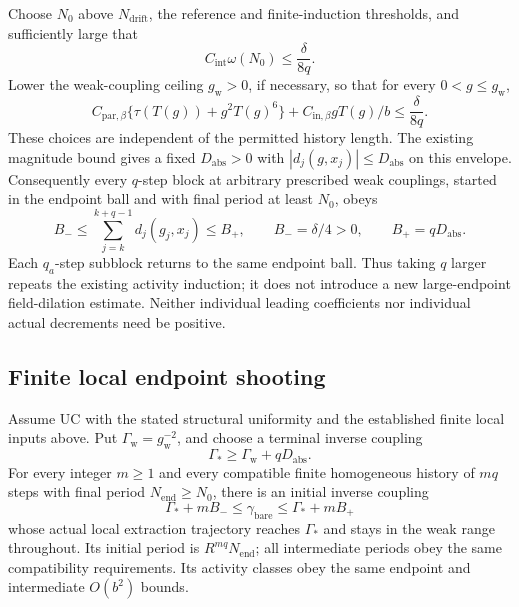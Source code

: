 Choose \(N_0\) above \(N_{\mathrm{drift}}\), the reference and
finite-induction thresholds, and sufficiently large that
\begin{equation}
 C_{\mathrm{int}}\omega(N_0)\le\frac{\delta}{8q}.
 \label{lpd-period-threshold}
\end{equation}
Lower the weak-coupling ceiling \(g_{\mathrm w}>0\), if necessary,
so that for every \(0<g\le g_{\mathrm w}\),
\begin{equation}
 C_{\mathrm{par},\beta}
       \{\tau(T(g))+g^2T(g)^6\}
      +C_{\mathrm{in},\beta}gT(g)/b
       \le\frac{\delta}{8q}.
 \label{lpd-coupling-threshold}
\end{equation}
These choices are independent of the permitted history length.
The existing magnitude bound gives a fixed \(D_{\mathrm{abs}}>0\)
with \(|d_j(g,x_j)|\le D_{\mathrm{abs}}\) on this envelope.
Consequently every \(q\)-step block at arbitrary prescribed weak
couplings, started in the endpoint ball and with final period at
least \(N_0\), obeys
\begin{equation}
 B_-\le\sum_{j=k}^{k+q-1}d_j(g_j,x_j)\le B_+,\qquad
 B_-=\delta/4>0,\qquad B_+=qD_{\mathrm{abs}}.
 \label{lpd-block-bounds}
\end{equation}
Each \(q_a\)-step subblock returns to the same endpoint ball.
Thus taking \(q\) larger repeats the existing activity induction;
it does not introduce a new large-endpoint field-dilation estimate.
Neither individual leading coefficients nor individual actual
decrements need be positive.

\subsection{Finite local endpoint shooting}
\label{lpd-shooting}

\begin{theorem}
\label{lpd-main}
Assume \(\mathrm{UC}\) with the stated structural uniformity and
the established finite local inputs above. Put
\(\Gamma_{\mathrm w}=g_{\mathrm w}^{-2}\), and choose a terminal
inverse coupling
\begin{equation}
                 \Gamma_*\ge
                    \Gamma_{\mathrm w}+qD_{\mathrm{abs}}.
 \label{lpd-terminal}
\end{equation}
For every integer \(m\ge1\) and every compatible finite homogeneous
history of \(mq\) steps with final period \(N_{\mathrm{end}}\ge N_0\),
there is an initial inverse coupling
\begin{equation}
 \Gamma_*+mB_-\le\gamma_{\mathrm{bare}}
                      \le\Gamma_*+mB_+
 \label{lpd-initial-interval}
\end{equation}
whose actual local extraction trajectory reaches \(\Gamma_*\)
and stays in the weak range throughout. Its initial period is
\(R^{mq}N_{\mathrm{end}}\); all intermediate periods obey the
same compatibility requirements. Its activity classes obey the
same endpoint and intermediate \(O(b^2)\) bounds.
\end{theorem}

